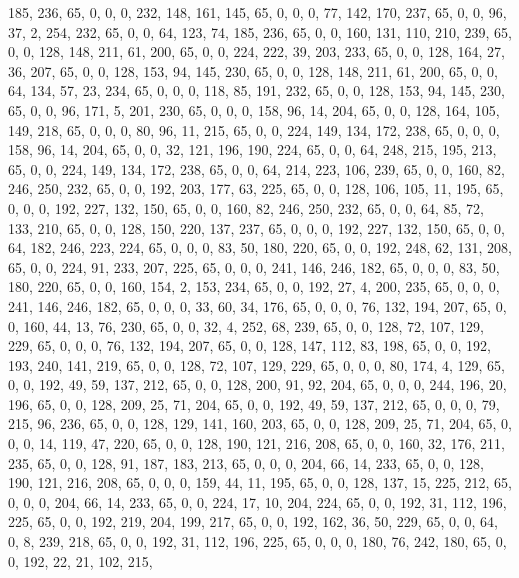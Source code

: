 \begin{DoxyCode}
       185, 236, 65, 0, 0, 0, 232, 148, 161, 145, 65, 0, 0, 0, 77, 142, 170, 237, 65, 0, 0, 96, 37, 2, 254, 232,
       65, 0, 0, 64, 123, 74, 185, 236, 65, 0, 0, 160, 131, 110, 210, 239, 65, 0, 0, 128, 148, 211, 61, 200, 65, 0,
       0, 224, 222, 39, 203, 233, 65, 0, 0, 128, 164, 27, 36, 207, 65, 0, 0, 128, 153, 94, 145, 230, 65, 0, 0, 128,
       148, 211, 61, 200, 65, 0, 0, 64, 134, 57, 23, 234, 65, 0, 0, 0, 118, 85, 191, 232, 65, 0, 0, 128, 153, 94,
       145, 230, 65, 0, 0, 96, 171, 5, 201, 230, 65, 0, 0, 0, 158, 96, 14, 204, 65, 0, 0, 128, 164, 105, 149, 218,
       65, 0, 0, 0, 80, 96, 11, 215, 65, 0, 0, 224, 149, 134, 172, 238, 65, 0, 0, 0, 158, 96, 14, 204, 65, 0, 0, 32,
       121, 196, 190, 224, 65, 0, 0, 64, 248, 215, 195, 213, 65, 0, 0, 224, 149, 134, 172, 238, 65, 0, 0, 64, 214,
       223, 106, 239, 65, 0, 0, 160, 82, 246, 250, 232, 65, 0, 0, 192, 203, 177, 63, 225, 65, 0, 0, 128, 106, 105,
       11, 195, 65, 0, 0, 0, 192, 227, 132, 150, 65, 0, 0, 160, 82, 246, 250, 232, 65, 0, 0, 64, 85, 72, 133, 210,
       65, 0, 0, 128, 150, 220, 137, 237, 65, 0, 0, 0, 192, 227, 132, 150, 65, 0, 0, 64, 182, 246, 223, 224, 65,
       0, 0, 0, 83, 50, 180, 220, 65, 0, 0, 192, 248, 62, 131, 208, 65, 0, 0, 224, 91, 233, 207, 225, 65, 0, 0, 0,
       241, 146, 246, 182, 65, 0, 0, 0, 83, 50, 180, 220, 65, 0, 0, 160, 154, 2, 153, 234, 65, 0, 0, 192, 27, 4,
       200, 235, 65, 0, 0, 0, 241, 146, 246, 182, 65, 0, 0, 0, 33, 60, 34, 176, 65, 0, 0, 0, 76, 132, 194, 207, 65, 0,
       0, 160, 44, 13, 76, 230, 65, 0, 0, 32, 4, 252, 68, 239, 65, 0, 0, 128, 72, 107, 129, 229, 65, 0, 0, 0, 76,
       132, 194, 207, 65, 0, 0, 128, 147, 112, 83, 198, 65, 0, 0, 192, 193, 240, 141, 219, 65, 0, 0, 128, 72, 107,
       129, 229, 65, 0, 0, 0, 80, 174, 4, 129, 65, 0, 0, 192, 49, 59, 137, 212, 65, 0, 0, 128, 200, 91, 92, 204,
       65, 0, 0, 0, 244, 196, 20, 196, 65, 0, 0, 128, 209, 25, 71, 204, 65, 0, 0, 192, 49, 59, 137, 212, 65, 0, 0, 0,
       79, 215, 96, 236, 65, 0, 0, 128, 129, 141, 160, 203, 65, 0, 0, 128, 209, 25, 71, 204, 65, 0, 0, 0, 14, 119,
       47, 220, 65, 0, 0, 128, 190, 121, 216, 208, 65, 0, 0, 160, 32, 176, 211, 235, 65, 0, 0, 128, 91, 187, 183,
       213, 65, 0, 0, 0, 204, 66, 14, 233, 65, 0, 0, 128, 190, 121, 216, 208, 65, 0, 0, 0, 159, 44, 11, 195, 65, 0,
       0, 128, 137, 15, 225, 212, 65, 0, 0, 0, 204, 66, 14, 233, 65, 0, 0, 224, 17, 10, 204, 224, 65, 0, 0, 192,
       31, 112, 196, 225, 65, 0, 0, 192, 219, 204, 199, 217, 65, 0, 0, 192, 162, 36, 50, 229, 65, 0, 0, 64, 0, 8,
       239, 218, 65, 0, 0, 192, 31, 112, 196, 225, 65, 0, 0, 0, 180, 76, 242, 180, 65, 0, 0, 192, 22, 21, 102, 215,

\end{DoxyCode}
